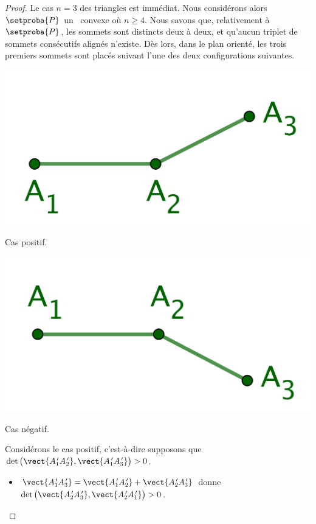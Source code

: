 \begin{proof}
	Le cas $n = 3$ des triangles est immédiat.
	Nous considérons alors $\setproba{P}$ un \ngone\ convexe où  $n \geq 4$.
	Nous savons que, relativement à $\setproba{P}$, les sommets sont distincts deux à deux, et qu'aucun triplet de sommets consécutifs alignés n'existe.
	Dès lors, dans le plan orienté, les trois premiers sommets sont placés suivant l'une des deux configurations suivantes. 
    
    \begin{multicols}{2}
        \small\itshape\centering
       	\includegraphics[scale=.45]{content/polygon/at-least-one/conv-det-sign-1.png}
    	    
    	\smallskip
        Cas positif.
        
        \includegraphics[scale=.45]{content/polygon/at-least-one/conv-det-sign-2.png}
    	    
    	\smallskip
        Cas négatif.
    \end{multicols}

    
    \noindent
    Considérons le cas positif, c'est-à-dire supposons que 
    $\det \big( \vect{A^{\,\prime}_1 A^{\,\prime}_2}, \vect{A^{\,\prime}_1 A^{\,\prime}_3} \big) > 0$.
	\begin{itemize}
    	\item $\vect{A^{\,\prime}_1 A^{\,\prime}_3} = \vect{A^{\,\prime}_1 A^{\,\prime}_2} + \vect{A^{\,\prime}_2 A^{\,\prime}_3}$
    	donne
		$\det \big( \vect{A^{\,\prime}_2 A^{\,\prime}_3}, \vect{A^{\,\prime}_2 A^{\,\prime}_1} \big) > 0$.



\end{itemize}
\end{proof}
